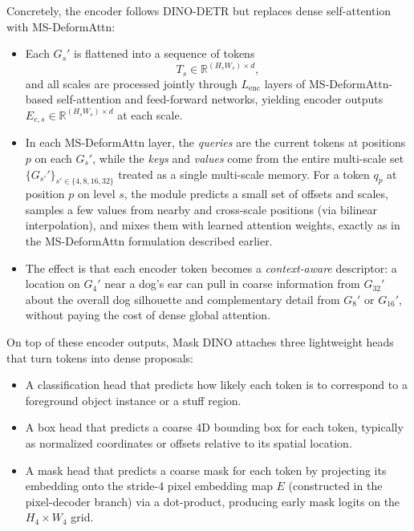 \begin{enrichment}
\begin{enrichment}
		Concretely, the encoder follows DINO-DETR but replaces dense self-attention with MS-DeformAttn:
		\begin{itemize}
			\item Each $G_s'$ is flattened into a sequence of tokens
			\[
			T_s \in \mathbb{R}^{(H_s W_s) \times d},
			\]
			and all scales are processed jointly through $L_{\text{enc}}$ layers of MS-DeformAttn-based self-attention and feed-forward networks, yielding encoder outputs $E_{e,s} \in \mathbb{R}^{(H_s W_s) \times d}$ at each scale.
			\item In each MS-DeformAttn layer, the \emph{queries} are the current tokens at positions $p$ on each $G_s'$, while the \emph{keys} and \emph{values} come from the entire multi-scale set $\{G_{s'}'\}_{s' \in \{4,8,16,32\}}$ treated as a single multi-scale memory.
			For a token $q_p$ at position $p$ on level $s$, the module predicts a small set of offsets and scales, samples a few values from nearby and cross-scale positions (via bilinear interpolation), and mixes them with learned attention weights, exactly as in the MS-DeformAttn formulation described earlier.
			\item The effect is that each encoder token becomes a \emph{context-aware} descriptor: a location on $G_4'$ near a dog’s ear can pull in coarse information from $G_{32}'$ about the overall dog silhouette and complementary detail from $G_8'$ or $G_{16}'$, without paying the cost of dense global attention.
		\end{itemize}
		
		On top of these encoder outputs, Mask DINO attaches three lightweight heads that turn tokens into dense proposals:
		\begin{itemize}
			\item A classification head that predicts how likely each token is to correspond to a foreground object instance or a stuff region.
			\item A box head that predicts a coarse 4D bounding box for each token, typically as normalized coordinates or offsets relative to its spatial location.
			\item A mask head that predicts a coarse mask for each token by projecting its embedding onto the stride-4 pixel embedding map $E$ (constructed in the pixel-decoder branch) via a dot-product, producing early mask logits on the $H_4 \times W_4$ grid.
		\end{itemize}
		

\end{enrichment}
\end{enrichment}

